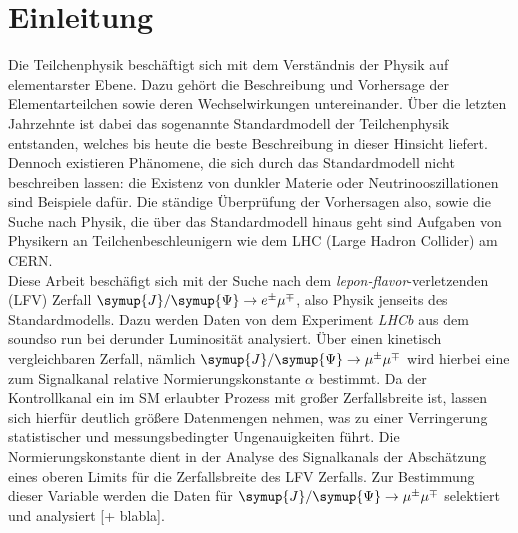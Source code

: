 \chapter{Einleitung}

Die Teilchenphysik beschäftigt sich mit dem Verständnis der Physik auf elementarster Ebene. Dazu gehört die Beschreibung und Vorhersage der Elementarteilchen sowie deren Wechselwirkungen untereinander. Über die letzten Jahrzehnte ist dabei das sogenannte Standardmodell der Teilchenphysik entstanden, welches bis heute die beste Beschreibung in dieser Hinsicht liefert. Dennoch existieren Phänomene, die sich durch das Standardmodell nicht beschreiben lassen: die Existenz von dunkler Materie oder Neutrinooszillationen sind Beispiele dafür. Die ständige Überprüfung der Vorhersagen also, sowie die Suche nach Physik, die über das Standardmodell hinaus geht sind Aufgaben von Physikern an Teilchenbeschleunigern wie dem LHC (Large Hadron Collider) am CERN. \\
Diese Arbeit beschäfigt sich mit der Suche nach dem \textit{lepon-flavor}-verletzenden (LFV) Zerfall $\symup{J}/\symup{\Psi}\rightarrow e^{\pm}\mu^{\mp}$, also Physik jenseits des Standardmodells.
Dazu werden Daten von dem Experiment \textit{LHCb} aus dem soundso run bei derunder Luminosität analysiert. Über einen kinetisch vergleichbaren Zerfall, nämlich $\symup{J}/\symup{\Psi}\rightarrow \mu^{\pm}\mu^{\mp}$ wird hierbei eine zum Signalkanal relative Normierungskonstante $\alpha$ bestimmt. Da der Kontrollkanal ein im SM erlaubter Prozess mit großer Zerfallsbreite ist, lassen sich hierfür deutlich größere Datenmengen nehmen, was zu einer Verringerung statistischer und messungsbedingter Ungenauigkeiten führt. Die Normierungskonstante dient in der Analyse des Signalkanals der Abschätzung eines oberen Limits für die Zerfallsbreite des LFV Zerfalls. Zur Bestimmung dieser Variable werden die Daten für $\symup{J}/\symup{\Psi}\rightarrow \mu^{\pm}\mu^{\mp}$ selektiert und analysiert [+ blabla].
